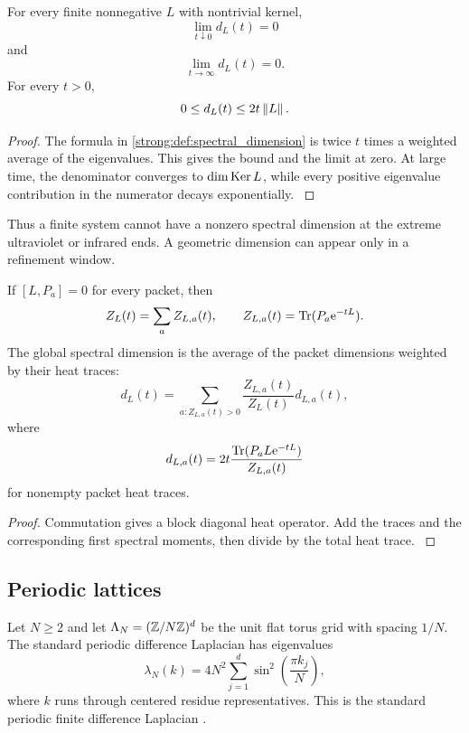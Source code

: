 \begin{proposition}\label{strong:proposition:009}\label{strong:prop:finite_spectral_limits}
For every finite nonnegative \(L\) with nontrivial kernel,
\[
\lim_{t\downarrow0}d_L(t)=0
\]
and
\[
\lim_{t\to\infty}d_L(t)=0.
\]
For every \(t>0\),
\[
0\leq d_L(t)\leq2t\left\lVert L\right\rVert.
\]
\end{proposition}

\begin{proof}\label{strong:proof:062}
The formula in \cref{strong:def:spectral_dimension} is twice \(t\) times a weighted average of the eigenvalues. This gives the bound and the limit at zero. At large time, the denominator converges to \(\dim\operatorname{Ker} L\), while every positive eigenvalue contribution in the numerator decays exponentially.
\label{strong:proof:062:end}\end{proof}

Thus a finite system cannot have a nonzero spectral dimension at the extreme ultraviolet or infrared ends. A geometric dimension can appear only in a refinement window.

\begin{proposition}\label{strong:proposition:010}\label{strong:prop:heat_packets}
If \([L,P_a]=0\) for every packet, then
\[
Z_L(t)=\sum_aZ_{L,a}(t),
\qquad
Z_{L,a}(t)=\Tr(P_a\e^{-tL}).
\]
The global spectral dimension is the average of the packet dimensions weighted by their heat traces:
\[
d_L(t)
=
\sum_{a:Z_{L,a}(t)>0}
\frac{Z_{L,a}(t)}{Z_L(t)}
 d_{L,a}(t),
\]
where
\[
d_{L,a}(t)
=2t
\frac{\Tr(P_aL\e^{-tL})}{Z_{L,a}(t)}
\]
for nonempty packet heat traces.
\end{proposition}

\begin{proof}\label{strong:proof:063}
Commutation gives a block diagonal heat operator. Add the traces and the corresponding first spectral moments, then divide by the total heat trace.
\label{strong:proof:063:end}\end{proof}

\subsection{Periodic lattices}\label{strong:subsec:periodic_lattices}

Let \(N\geq2\) and let \(\Lambda_N=(\ZZ/N\ZZ)^d\) be the unit flat torus grid with spacing \(1/N\). The standard periodic difference Laplacian has eigenvalues
\[
\lambda_N(k)
=
4N^2
\sum_{j=1}^{d}
\sin^2\left(\frac{\pi k_j}{N}\right),
\]
where \(k\) runs through centered residue representatives. This is the standard periodic finite difference Laplacian \cite{Strikwerda2004}.

